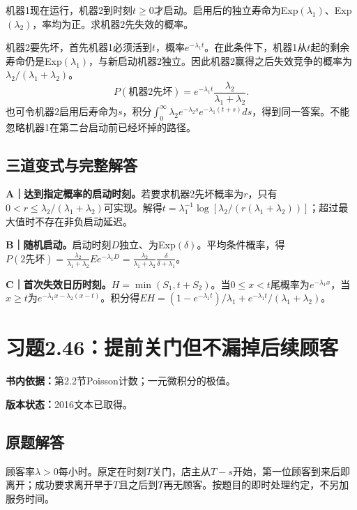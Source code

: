 \documentclass[
  11pt,
  a4paper,
  UTF8,fontset=fandol]{ctexart}
\let\OldSection\section
\renewcommand{\section}{\Needspace{7\baselineskip}\OldSection}
\let\OldSubsection\subsection
\renewcommand{\subsection}{\Needspace{5\baselineskip}\OldSubsection}
\begin{document}
机器1现在运行，机器2到时刻\(t\ge0\)才启动。启用后的独立寿命为Exp\((\lambda_1)\)、Exp\((\lambda_2)\)，率均为正。求机器2先失效的概率。

机器2要先坏，首先机器1必须活到\(t\)，概率\(e^{-\lambda_1t}\)。在此条件下，机器1从\(t\)起的剩余寿命仍是Exp\((\lambda_1)\)，与新启动机器2独立。因此机器2赢得之后失效竞争的概率为\(\lambda_2/(\lambda_1+\lambda_2)\)。
\[\boxed{P(\text{机器2先坏})=e^{-\lambda_1t}\frac{\lambda_2}{\lambda_1+\lambda_2}.}\]
也可令机器2启用后寿命为\(s\)，积分\(\int_0^\infty\lambda_2e^{-\lambda_2s}e^{-\lambda_1(t+s)}ds\)，得到同一答案。不能忽略机器1在第二台启动前已经坏掉的路径。

\subsection{三道变式与完整解答}\label{ux4e09ux9053ux53d8ux5f0fux4e0eux5b8cux6574ux89e3ux7b54-44}

\textbf{A｜达到指定概率的启动时刻。}若要求机器2先坏概率为\(r\)，只有\(0<r\le\lambda_2/(\lambda_1+\lambda_2)\)可实现。解得\(t=\lambda_1^{-1}\log[\lambda_2/(r(\lambda_1+\lambda_2))]\)；超过最大值时不存在非负启动延迟。

\textbf{B｜随机启动。}启动时刻\(D\)独立、为Exp\((\delta)\)。平均条件概率，得\(P(2\text{先坏})=\frac{\lambda_2}{\lambda_1+\lambda_2}E e^{-\lambda_1D}=\frac{\lambda_2}{\lambda_1+\lambda_2}\frac\delta{\delta+\lambda_1}\)。

\textbf{C｜首次失效日历时刻。}\(H=\min(S_1,t+S_2)\)。当\(0\le x<t\)尾概率为\(e^{-\lambda_1x}\)，当\(x\ge t\)为\(e^{-\lambda_1x-\lambda_2(x-t)}\)。积分得\(EH=(1-e^{-\lambda_1t})/\lambda_1+e^{-\lambda_1t}/(\lambda_1+\lambda_2)\)。

\newpage

\section{习题2.46：提前关门但不漏掉后续顾客}\label{ux4e60ux98982.46ux63d0ux524dux5173ux95e8ux4f46ux4e0dux6f0fux6389ux540eux7eedux987eux5ba2}

\textbf{书内依据：}第2.2节Poisson计数；一元微积分的极值。

\textbf{版本状态：}2016文本已取得。

\subsection{原题解答}\label{ux539fux9898ux89e3ux7b54-45}

顾客率\(\lambda>0\)每小时。原定在时刻\(T\)关门，店主从\(T-s\)开始，第一位顾客到来后即离开；成功要求离开早于\(T\)且之后到\(T\)再无顾客。按题目的即时处理约定，不另加服务时间。
\end{document}
